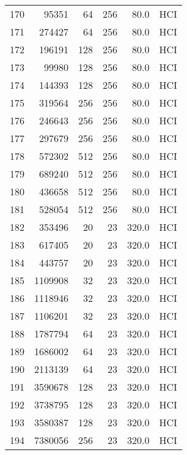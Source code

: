 \begin{longtable}{lrrrrl}
170 &     95351 &         64 &       256 &           80.0 &  HCI \\
171 &    274427 &         64 &       256 &           80.0 &  HCI \\
172 &    196191 &        128 &       256 &           80.0 &  HCI \\
173 &     99980 &        128 &       256 &           80.0 &  HCI \\
174 &    144393 &        128 &       256 &           80.0 &  HCI \\
175 &    319564 &        256 &       256 &           80.0 &  HCI \\
176 &    246643 &        256 &       256 &           80.0 &  HCI \\
177 &    297679 &        256 &       256 &           80.0 &  HCI \\
178 &    572302 &        512 &       256 &           80.0 &  HCI \\
179 &    689240 &        512 &       256 &           80.0 &  HCI \\
180 &    436658 &        512 &       256 &           80.0 &  HCI \\
181 &    528054 &        512 &       256 &           80.0 &  HCI \\
182 &    353496 &         20 &        23 &          320.0 &  HCI \\
183 &    617405 &         20 &        23 &          320.0 &  HCI \\
184 &    443757 &         20 &        23 &          320.0 &  HCI \\
185 &   1109908 &         32 &        23 &          320.0 &  HCI \\
186 &   1118946 &         32 &        23 &          320.0 &  HCI \\
187 &   1106201 &         32 &        23 &          320.0 &  HCI \\
188 &   1787794 &         64 &        23 &          320.0 &  HCI \\
189 &   1686002 &         64 &        23 &          320.0 &  HCI \\
190 &   2113139 &         64 &        23 &          320.0 &  HCI \\
191 &   3590678 &        128 &        23 &          320.0 &  HCI \\
192 &   3738795 &        128 &        23 &          320.0 &  HCI \\
193 &   3580387 &        128 &        23 &          320.0 &  HCI \\
194 &   7380056 &        256 &        23 &          320.0 &  HCI \\

\end{longtable}
